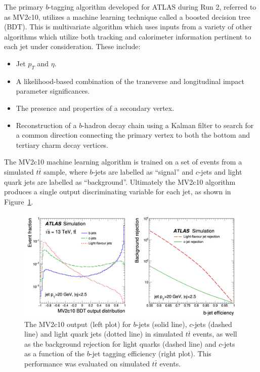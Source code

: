 The primary $b$-tagging algorithm developed for ATLAS during Run 2, referred to as MV2c10, utilizes a machine learning technique called a boosted decision tree (BDT).
This is multivariate algorithm which uses inputs from a variety of other algorithms which utilize both tracking and calorimeter information pertinent to each jet under consideration. These include:
\begin{itemize}
    \itemsep0em 
    \item Jet $p_T$ and $\eta$.
    \item A likelihood-based combination of the transverse and longitudinal impact parameter significances. %
    \item The presence and properties of a secondary vertex.
    \item Reconstruction of a $b$-hadron decay chain using a Kalman filter to search for a common direction connecting the primary vertex to both the bottom and tertiary charm decay vertices.
\end{itemize}

The MV2c10 machine learning algorithm is trained on a set of events from a simulated $t\bar{t}$ sample, where $b$-jets are labelled as ``signal'' and $c$-jets and light quark jets are labelled as ``background''.
Ultimately the MV2c10 algorithm produces a single output discriminating variable for each jet, as shown in Figure~\ref{fig:mv2c10_discriminant}.

\begin{figure}
	\centering
	\includegraphics[width=\textwidth]{mv2c10_discriminant}
	\caption{
	The MV2c10 output (left plot) for $b$-jets (solid line), $c$-jets (dashed line) and light quark jets (dotted line) in simulated $t\bar{t}$ events, as well as the background rejection for light quarks (dashed line) and $c$-jets as a function of the $b$-jet tagging efficiency (right plot).
	This performance was evaluated on simulated $t\bar{t}$ events.
    \cite{Aaboud:2018xwy}
	}
	\label{fig:mv2c10_discriminant}
\end{figure}

